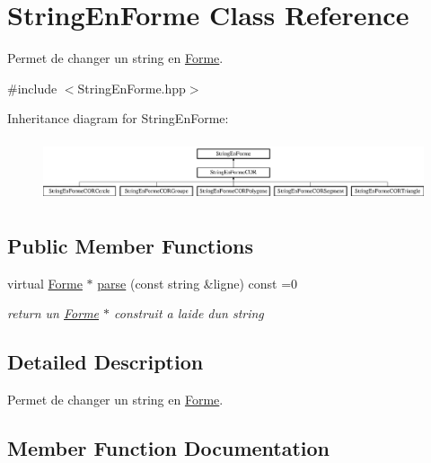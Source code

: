\hypertarget{class_string_en_forme}{}\section{String\+En\+Forme Class Reference}
\label{class_string_en_forme}


Permet de changer un string en \mbox{\hyperlink{class_forme}{Forme}}.  




{\ttfamily \#include $<$String\+En\+Forme.\+hpp$>$}

Inheritance diagram for String\+En\+Forme\+:\begin{figure}[H]
\begin{center}
\leavevmode
\includegraphics[height=1.826087cm]{class_string_en_forme}
\end{center}
\end{figure}
\subsection*{Public Member Functions}
\begin{DoxyCompactItemize}
\item 
virtual \mbox{\hyperlink{class_forme}{Forme}} $\ast$ \mbox{\hyperlink{class_string_en_forme_a9bc80e648471ed76fec821b8895d41d9}{parse}} (const string \&ligne) const =0
\begin{DoxyCompactList}\small\item\em return un \mbox{\hyperlink{class_forme}{Forme}} $\ast$ construit a l\textquotesingle{}aide d\textquotesingle{}un string \end{DoxyCompactList}\end{DoxyCompactItemize}


\subsection{Detailed Description}
Permet de changer un string en \mbox{\hyperlink{class_forme}{Forme}}. 

\subsection{Member Function Documentation}
\mbox{\label{class_string_en_forme_a9bc80e648471ed76fec821b8895d41d9}} 
